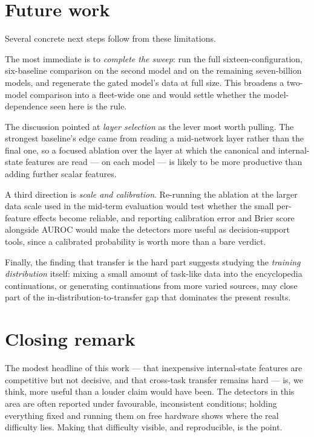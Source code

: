 \section{Future work}

Several concrete next steps follow from these limitations.

The most immediate is to \emph{complete the sweep}: run the full sixteen-configuration,
six-baseline comparison on the second model and on the remaining seven-billion models, and
regenerate the gated model's data at full size. This broadens a two-model comparison into a
fleet-wide one and would settle whether the model-dependence seen here is the rule.

The discussion pointed at \emph{layer selection} as the lever most worth pulling. The strongest
baseline's edge came from reading a mid-network layer rather than the final one, so a focused
ablation over the layer at which the canonical and internal-state features are read --- on each
model --- is likely to be more productive than adding further scalar features.

A third direction is \emph{scale and calibration}. Re-running the ablation at the larger
data scale used in the mid-term evaluation would test whether the small per-feature effects
become reliable, and reporting calibration error and Brier score alongside AUROC would make the
detectors more useful as decision-support tools, since a calibrated probability is worth more
than a bare verdict.

Finally, the finding that transfer is the hard part suggests studying the \emph{training
distribution} itself: mixing a small amount of task-like data into the encyclopedia
continuations, or generating continuations from more varied sources, may close part of the
in-distribution-to-transfer gap that dominates the present results.

\section{Closing remark}

The modest headline of this work --- that inexpensive internal-state features are competitive
but not decisive, and that cross-task transfer remains hard --- is, we think, more useful than a
louder claim would have been. The detectors in this area are often reported under favourable,
inconsistent conditions; holding everything fixed and running them on free hardware shows where
the real difficulty lies. Making that difficulty visible, and reproducible, is the point.
